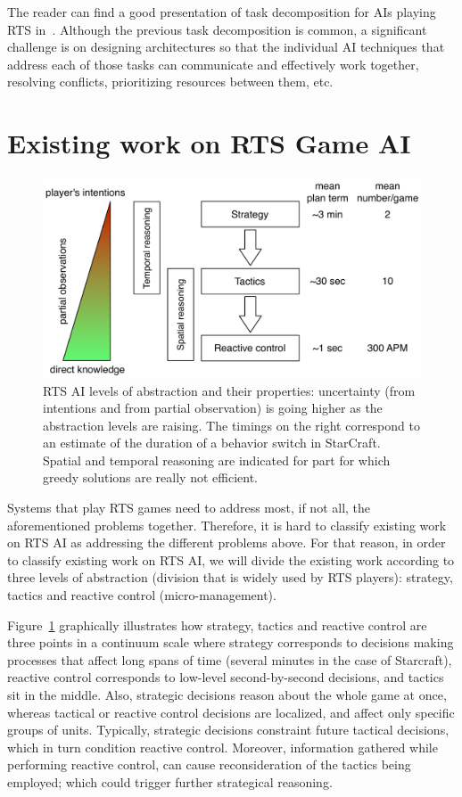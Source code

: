 \documentclass[journal]{IEEEtran}
\begin{document}
The reader can find a  good presentation of task decomposition for AIs
playing RTS in~\cite{weber2011acs}. Although the previous task decomposition is common, a significant challenge is on designing architectures so that the individual AI techniques that address each of those tasks can communicate and effectively work together, resolving conflicts, prioritizing resources between them, etc.


\section{Existing work on RTS Game AI}\label{sec:review}

\begin{figure}
    \centering
    \includegraphics[width=0.9\columnwidth]{figures/levels_abstraction.pdf}
    \caption{RTS AI levels of abstraction and their properties: uncertainty (from intentions and from partial observation) is going higher as the abstraction levels are raising. The timings on the right correspond to an estimate of the duration of a behavior switch in StarCraft. Spatial and temporal reasoning are indicated for part for which greedy solutions are really not efficient.}
    \label{fig:levels-abstraction}
\end{figure}

Systems that play RTS games need to address most, if not all, the aforementioned problems together. Therefore, it is hard to classify existing work on RTS AI as addressing the different problems above. For that reason, in order to classify existing work on RTS AI, we will divide the existing work according to three levels of abstraction (division that is widely used by RTS players): strategy, tactics and reactive control (micro-management). 

Figure~\ref{fig:levels-abstraction} graphically illustrates how strategy, tactics and reactive control are three points in a continuum scale where strategy corresponds to decisions making processes that affect long spans of time (several minutes in the case of Starcraft), reactive control corresponds to low-level second-by-second decisions, and tactics sit in the middle. Also, strategic decisions reason about the whole game at once, whereas tactical or reactive control decisions are localized, and affect only specific groups of units. Typically, strategic decisions constraint future tactical decisions, which in turn condition reactive control. Moreover, information gathered while performing reactive control, can cause reconsideration of the tactics being employed; which could trigger further strategical reasoning.
\end{document}
